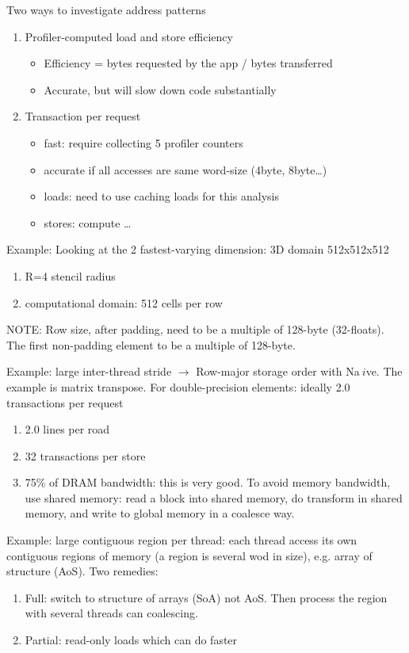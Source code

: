 Two ways to investigate address patterns
\begin{enumerate}
  \item Profiler-computed load and store efficiency
  \begin{itemize}
      \item Efficiency = bytes requested by the app / bytes transferred
  \item Accurate, but will slow down code substantially
  \end{itemize}
  \item Transaction per request
  \begin{itemize}
    \item fast: require collecting 5 profiler counters
    \item accurate if all accesses are same word-size (4byte, 8byte\ldots)
    \item loads: need to use caching loads for this analysis
    \item stores: compute \ldots
  \end{itemize}
\end{enumerate}

Example: Looking at the 2 fastest-varying dimension: 3D domain 512x512x512 
\begin{enumerate}
  \item R=4 stencil radius
  \item computational domain: 512 cells per row
\end{enumerate}
NOTE: Row size, after padding, need to be a multiple of 128-byte (32-floats).
The first non-padding element to be a multiple of 128-byte. 

Example: large inter-thread stride $\rightarrow$ Row-major storage order with
Na$\:i$ve. The example is matrix transpose. For double-precision elements:
ideally 2.0 transactions per request
\begin{enumerate}
  \item 2.0 lines per road
  \item 32 transactions per store
  \item 75\% of DRAM bandwidth: this is very good. To avoid memory bandwidth,
  use shared memory: read a block into shared memory, do transform in shared
  memory, and write to global memory in a coalesce way. 
\end{enumerate}


Example: large contiguous region per thread: each thread access its own
contiguous regions of memory (a region is several wod in size), e.g. array of
structure (AoS). Two remedies:
\begin{enumerate}
  \item Full: switch to structure of arrays (SoA) not AoS. Then process the
  region with several threads can coalescing. 
  \item Partial: read-only loads which can do faster
\end{enumerate}

